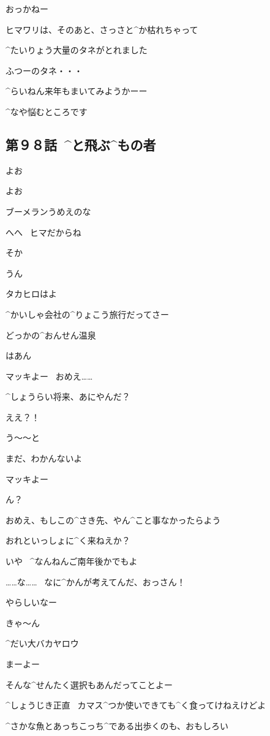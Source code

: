  おっかねー

\page
\A ヒマワリは、そのあと、さっさと^{か}{枯}れちゃって

\A ^{たいりょう}{大量}のタネがとれました

\A ふつーのタネ・・・

\A ^{らいねん}{来年}もまいてみようかーー

\A ^{なや}{悩}むところです


\subsection{第９８話\ ^{と}{飛}ぶ^{もの}{者}}

\page[140]
\Y よお

\M よお

\page
\Y ブーメランうめえのな

\M へへ
\ ヒマだからね

\Y そか

\M うん

\Y タカヒロはよ

\M ^{かいしゃ}{会社}の^{りょこう}{旅行}だってさー

\M どっかの^{おんせん}{温泉}

\Y はあん

\page
\Y マッキよー
\ おめえ……

\Y ^{しょうらい}{将来}、あにやんだ？

\M ええ？！

\M う〜〜と

\M まだ、わかんないよ

\page
\Y マッキよー

\M ん？

\Y おめえ、もしこの^{さき}{先}、やん^{こと}{事}なかったらよう

\Y おれといっしょに^{く}{来}ねえか？

\Y いや
\ ^{なんねんご}{南年後}かでもよ

\page
\M ……な……
\ なに^{かんが}{考}えてんだ、おっさん！

\M やらしいなー

\M きゃ〜ん

\Y ^{だい}{大}バカヤロウ

\Y まーよー

\Y そんな^{せんたく}{選択}もあんだってことよー

\Y ^{しょうじき}{正直}
\ カマス^{つか}{使}いできても^{く}{食}ってけねえけどよ

\Y ^{さかな}{魚}とあっちこっち^{である}{出歩}くのも、おもしろい

